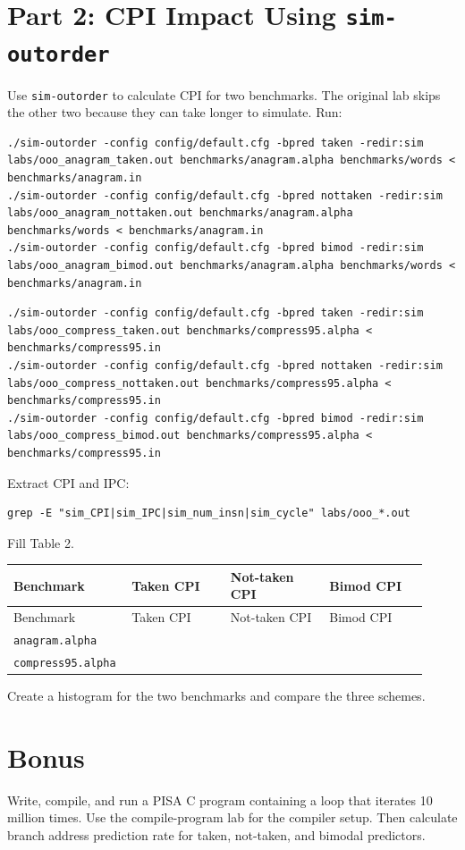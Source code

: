 \documentclass[11pt]{article}
\begin{document}
\section{Part 2: CPI Impact Using \texttt{sim-outorder}}
Use \texttt{sim-outorder} to calculate CPI for two benchmarks. The original lab skips the other two because they can take longer to simulate.
Run:
\begin{lstlisting}
./sim-outorder -config config/default.cfg -bpred taken -redir:sim labs/ooo_anagram_taken.out benchmarks/anagram.alpha benchmarks/words < benchmarks/anagram.in
./sim-outorder -config config/default.cfg -bpred nottaken -redir:sim labs/ooo_anagram_nottaken.out benchmarks/anagram.alpha benchmarks/words < benchmarks/anagram.in
./sim-outorder -config config/default.cfg -bpred bimod -redir:sim labs/ooo_anagram_bimod.out benchmarks/anagram.alpha benchmarks/words < benchmarks/anagram.in
\end{lstlisting}
\begin{lstlisting}
./sim-outorder -config config/default.cfg -bpred taken -redir:sim labs/ooo_compress_taken.out benchmarks/compress95.alpha < benchmarks/compress95.in
./sim-outorder -config config/default.cfg -bpred nottaken -redir:sim labs/ooo_compress_nottaken.out benchmarks/compress95.alpha < benchmarks/compress95.in
./sim-outorder -config config/default.cfg -bpred bimod -redir:sim labs/ooo_compress_bimod.out benchmarks/compress95.alpha < benchmarks/compress95.in
\end{lstlisting}
Extract CPI and IPC:
\begin{lstlisting}
grep -E "sim_CPI|sim_IPC|sim_num_insn|sim_cycle" labs/ooo_*.out
\end{lstlisting}
Fill Table 2.
\begin{center}
\scriptsize
\begin{longtable}{|p{0.23\linewidth}|p{0.23\linewidth}|p{0.23\linewidth}|p{0.23\linewidth}|}
\hline
Benchmark & Taken CPI & Not-taken CPI & Bimod CPI \\
\hline
\endfirsthead
\hline
Benchmark & Taken CPI & Not-taken CPI & Bimod CPI \\
\hline
\endhead
\texttt{anagram.alpha} &  &  &  \\
\hline
\texttt{compress95.alpha} &  &  &  \\
\hline
\end{longtable}
\normalsize
\end{center}
Create a histogram for the two benchmarks and compare the three schemes.
\section{Bonus}
Write, compile, and run a PISA C program containing a loop that iterates 10 million times. Use the compile-program lab for the compiler setup. Then calculate branch address prediction rate for taken, not-taken, and bimodal predictors.
\end{document}
